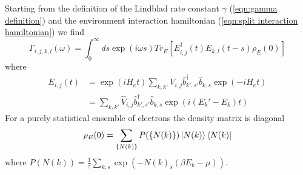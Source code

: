 Starting from the definition of
the Lindblad rate constant \(\gamma{}\)
(\cref{eqn:gamma definition}) and
the environment interaction hamiltonian
(\cref{eqn:split interaction hamiltonian})
we find
\begin{equation}
    \Gamma_{i,j, k,l}(\omega) =
    \int_0^\infty{}{
    ds \exp{(i\omega{}s)}
    Tr_{E}[E^\dagger_{i,j}(t)E_{k,l}(t-s)\rho_E(0)]
    }
\end{equation}
where
\begin{align}
    E_{i, j}(t) & =
    \exp{(iH_e t)}
    \sum_{k,k'} V_{i,j} \hat{b}^\dagger_{k',s'}\hat{b}_{k,s}
    \exp{(-iH_e t)}                           \\
                & = \sum_{k,k'} \hat{V}_{i,j}
    \hat{b}^\dagger_{k',s'}\hat{b}_{k,s} \exp{(i(E_k' - E_k)t)}
\end{align}
For a purely
statistical ensemble of electrons
the density matrix is
diagonal~\cite{sakurai_napolitano_2020}
\begin{equation}
    \rho_E(0) = \sum_{\{N(k)\}}
    P(\{N(k)\})
    \ket{N(k)} \bra{N(k)}
\end{equation}
where \(P(N(k)) =
\frac{1}{z}\sum_{k,s}
\exp{(-{N(k)}_s(\beta E_k - \mu))}\).

